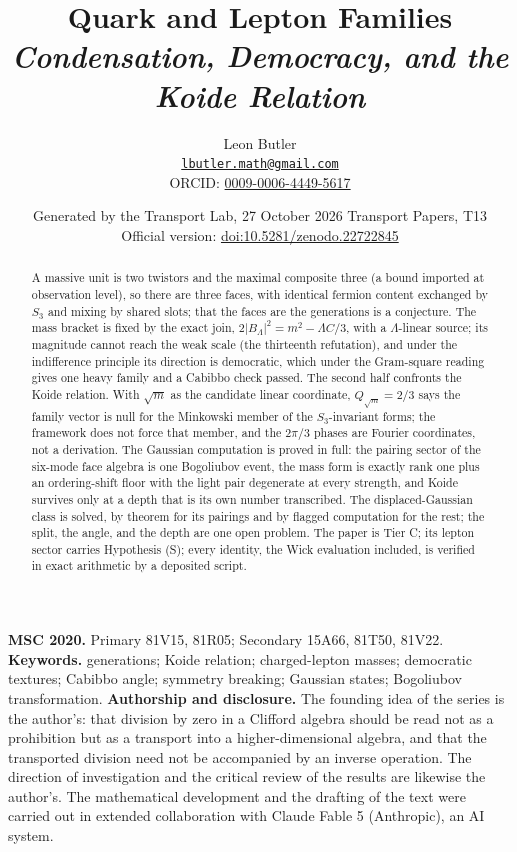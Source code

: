 \documentclass[11pt]{article}
\title{\bfseries Quark and Lepton Families\\[4pt]\large\itshape Condensation, Democracy, and the Koide Relation}
\author{Leon Butler\\ \normalsize\href{mailto:lbutler.math@gmail.com}{\texttt{lbutler.math@gmail.com}}\\ \normalsize ORCID: \href{https://orcid.org/0009-0006-4449-5617}{0009-0006-4449-5617}}
\date{Generated by the Transport Lab, 27 October 2026 \textperiodcentered{} Transport Papers, T13\\[3pt]\small Official version: \href{https://doi.org/10.5281/zenodo.22722845}{doi:10.5281/zenodo.22722845}}
\theoremstyle{definition}
\theoremstyle{plain}
\begin{document}
\maketitle
\begin{abstract}
\normalsize
A massive unit is two twistors and the maximal composite three (a bound imported at observation level), so there are three faces, with identical fermion content exchanged by $S_{3}$ and mixing by shared slots; that the faces are the generations is a conjecture. The mass bracket is fixed by the exact join, $2|B_{\Lambda}|^{2} = m^{2} - \Lambda C/3$, with a $\Lambda$-linear source; its magnitude cannot reach the weak scale (the thirteenth refutation), and under the indifference principle its direction is democratic, which under the Gram-square reading gives one heavy family and a Cabibbo check passed. The second half confronts the Koide relation. With $\sqrt{m}$ as the candidate linear coordinate, $Q_{\sqrt{m}} = 2/3$ says the family vector is null for the Minkowski member of the $S_{3}$-invariant forms; the framework does not force that member, and the $2\pi/3$ phases are Fourier coordinates, not a derivation. The Gaussian computation is proved in full: the pairing sector of the six-mode face algebra is one Bogoliubov event, the mass form is exactly rank one plus an ordering-shift floor with the light pair degenerate at every strength, and Koide survives only at a depth that is its own number transcribed. The displaced-Gaussian class is solved, by theorem for its pairings and by flagged computation for the rest; the split, the angle, and the depth are one open problem. The paper is Tier C; its lepton sector carries Hypothesis (S); every identity, the Wick evaluation included, is verified in exact arithmetic by a deposited script.
\end{abstract}
\medskip
\noindent\textbf{MSC 2020.} Primary 81V15, 81R05; Secondary 15A66, 81T50, 81V22.\\
\textbf{Keywords.} generations; Koide relation; charged-lepton masses; democratic textures; Cabibbo angle; symmetry breaking; Gaussian states; Bogoliubov transformation.
\newpage
\noindent \textbf{Authorship and disclosure. }The founding idea of the series is the author's: that division by zero in a Clifford algebra should be read not as a prohibition but as a transport into a higher-dimensional algebra, and that the transported division need not be accompanied by an inverse operation. The direction of investigation and the critical review of the results are likewise the author's. The mathematical development and the drafting of the text were carried out in extended collaboration with Claude Fable 5 (Anthropic), an AI system.
\end{document}
